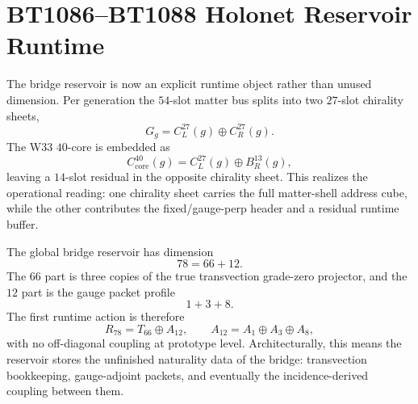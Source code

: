 \section{BT1086--BT1088 Holonet Reservoir Runtime}
\label{sec:bt1086-bt1088-holonet-reservoir-runtime}

The bridge reservoir is now an explicit runtime object rather than unused dimension.  Per generation the $54$-slot matter bus splits into two $27$-slot chirality sheets,
\[
G_g=C^{27}_L(g)\oplus C^{27}_R(g).
\]
The W33 $40$-core is embedded as
\[
C^{40}_{\mathrm{core}}(g)=C^{27}_L(g)\oplus B^{13}_R(g),
\]
leaving a $14$-slot residual in the opposite chirality sheet.  This realizes the operational reading: one chirality sheet carries the full matter-shell address cube, while the other contributes the fixed/gauge-perp header and a residual runtime buffer.

The global bridge reservoir has dimension
\[
78=66+12.
\]
The $66$ part is three copies of the true transvection grade-zero projector, and the $12$ part is the gauge packet profile
\[
1+3+8.
\]
The first runtime action is therefore
\[
R_{78}=T_{66}\oplus A_{12},
\qquad
A_{12}=A_1\oplus A_3\oplus A_8,
\]
with no off-diagonal coupling at prototype level.  Architecturally, this means the reservoir stores the unfinished naturality data of the bridge: transvection bookkeeping, gauge-adjoint packets, and eventually the incidence-derived coupling between them.
